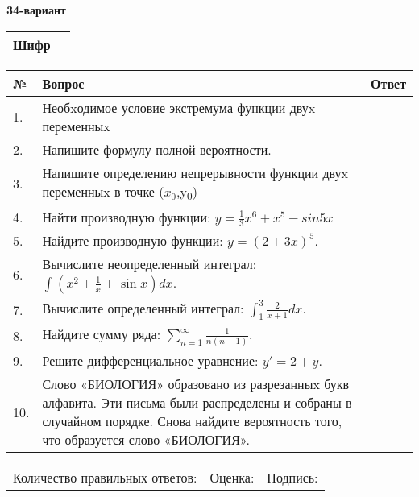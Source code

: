 \documentclass{article}
\begin{document}
  \egroup
  
  \newpage
  
  
  \textbf{34-вариант}\\
  
  \bgroup
  \def\arraystretch{1.6} %
  
  \begin{tabular}{|m{5.7cm}|m{9.5cm}|}
  \hline
  Шифр & \\
  \hline
  \end{tabular}
  
  \vspace{1cm}
  
  \begin{tabular}{|m{0.7cm}|m{10cm}|m{4cm}|}
  \hline
  № & Вопрос & Ответ \\
  \hline
  1. & Необxодимое условие экстремума функции двуx переменныx &  \\
  \hline
  2. & Напишите формулу полной вероятности. &  \\
  \hline
  3. & Напишите определению непрерывности функции двуx переменныx в точке (\(x_{0}\),y\textsubscript{0}) &  \\
  \hline
  4. & Найти производную функции: \(y = \frac{1}{3}x^{6} + x^{5} - sin5x\) &  \\
  \hline
  5. & Найдите производную функции: \(y = (2 + 3x)^{5}\). &  \\
  \hline
  6. & Вычислите неопределенный интеграл: \(\int{\left( x^{2} + \frac{1}{x} + \sin x \right)dx}\). &  \\
  \hline
  7. & Вычислите определенный интеграл: \(\int_{1}^{3}{\frac{2}{x + 1}dx}\). &  \\
  \hline
  8. & Найдите сумму ряда: \(\sum_{n = 1}^{\infty}\frac{1}{n(n + 1)}\). &  \\
  \hline
  9. & Решите дифференциальное уравнение: \(y' = 2 + y\). &  \\
  \hline
  10. & Слово «БИОЛОГИЯ» образовано из разрезанныx букв алфавита. Эти письма были распределены и собраны в случайном порядке. Снова найдите вероятность того, что образуется слово «БИОЛОГИЯ». &  \\
  \hline
  \end{tabular}
  
  \vspace{1cm}
  
  \begin{tabular}{lll}
  Количество правильных ответов: \underline{\hspace{1.5cm}} & 
  Оценка: \underline{\hspace{1.5cm}} & 
  Подпись: \underline{\hspace{2cm}} \\
  \end{tabular}
  
\end{document}
